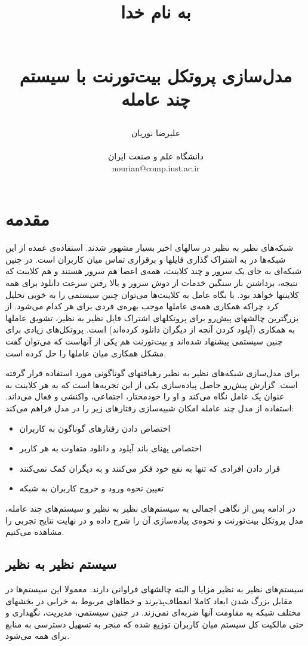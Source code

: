 \documentclass{article}
\title{
\begin{normalsize} به نام خدا \end{normalsize}
\\[2cm]
 مدل‌سازی پروتکل بیت‌تورنت با سیستم چند عامله
}
\author{علیرضا نوریان
\\
\\ \small دانشگاه علم و صنعت ایران
\\ \small nourian@comp.iust.ac.ir
}
\begin{document}
\maketitle

\section{مقدمه}
شبکه‌های نظیر به نظیر در سالهای اخیر بسیار مشهور شدند. استفاده‌ی عمده از این شبکه‌ها در به اشتراک گذاری فایلها و برقراری تماس میان کاربران است. در چنین شبکه‌ای به جای یک سرور و چند کلاینت، همه‌ی اعضا هم سرور هستند و هم کلاینت که نتیجه، برداشتن بار سنگین خدمات از دوش سرور و بالا رفتن سرعت دانلود برای همه کلاینتها خواهد بود. با نگاه عامل به کلاینت‌ها می‌توان چنین سیستمی را به خوبی تحلیل کرد چراکه همکاری  همه‌ی عاملها موجب بهره‌ی فردی برای هر کدام می‌شود. از بزرگترین چالشهای پیش‌رو برای پروتکلهای اشتراک فایل نظیر به نظیر، تشویق عاملها به همکاری (آپلود کردن آنچه از دیگران دانلود کرده‌اند) است. پروتکل‌های زیادی برای چنین سیستمی پیشنهاد شده‌اند و بیت‌تورنت هم یکی از آنهاست که می‌توان گفت مشکل همکاری میان عاملها را حل کرده است.

برای مدل‌سازی شبکه‌های نظیر به نظیر رهیافتهای گوناگونی مورد استفاده قرار گرفته است. گزارش پیش‌رو حاصل پیاده‌سازی یکی از این تجربه‌ها\cite{mas-torrent} است که به هر کلاینت به عنوان یک عامل نگاه می‌کند و او را خودمختار، اجتماعی، واکنشی و فعال می‌داند. استفاده از مدل چند عامله امکان شبیه‌سازی رفتارهای زیر را در مدل فراهم می‌کند:
\begin{itemize}
\item
اختصاص دادن رفتارهای گوناگون به کاربران
\item
اختصاص پهنای باند آپلود و دانلود متفاوت به هر کاربر
\item
قرار دادن افرادی که تنها به نفع خود فکر می‌کنند و به دیگران کمک نمی‌کنند
\item
تعیین نحوه ورود و خروج کاربران به شبکه
\end{itemize}

در ادامه پس از نگاهی اجمالی به سیستم‌های نظیر به نظیر و سیستم‌های چند عامله، مدل پروتکل بیت‌تورنت و نحوه‌ی پیاده‌سازی آن را شرح داده و در نهایت نتایج تجربی را مشاهده می‌کنیم. 

\subsection{سیستم نظیر به نظیر}
سیستم‌های نظیر به نظیر مزایا و البته چالشهای فراوانی دارند. معمولا این سیستم‌ها در مقابل بزرگ شدن ابعاد کاملا انعطاف‌پذیرند و خطاهای مربوط به خرابی در بخشهای مختلف شبکه به مقاومت آنها ضربه‌ای نمی‌زند. در چنین سیستمی، مدیریت، نگهداری و حتی مالکیت کل سیستم میان کاربران توزیع شده که منجر به تسهیل دسترسی به منابع برای همه می‌شود.
\end{document}
